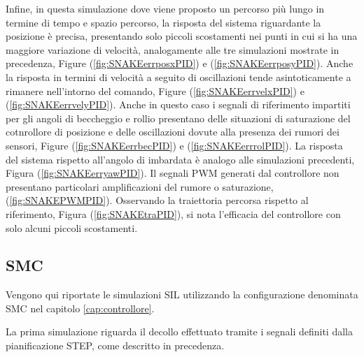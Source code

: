 Infine, in questa simulazione dove viene proposto un percorso più lungo in termine di tempo e spazio percorso, la risposta del sistema riguardante la posizione è precisa, presentando solo piccoli scostamenti nei punti in cui si ha una maggiore variazione di velocità, analogamente alle tre simulazioni mostrate in precedenza, Figure (\ref{fig:SNAKEerrposxPID}) e (\ref{fig:SNAKEerrposyPID}). Anche la risposta in termini di velocità a seguito di oscillazioni tende asintoticamente a rimanere nell'intorno del comando, Figure (\ref{fig:SNAKEerrvelxPID}) e (\ref{fig:SNAKEerrvelyPID}). Anche in questo caso i segnali di riferimento impartiti per gli angoli di beccheggio e rollio presentano delle situazioni di saturazione del cotnrollore di posizione e delle oscillazioni dovute alla presenza dei rumori dei sensori, Figure (\ref{fig:SNAKEerrbecPID}) e (\ref{fig:SNAKEerrrolPID}). La risposta del sistema rispetto all'angolo di imbardata è analogo alle simulazioni precedenti, Figura (\ref{fig:SNAKEerryawPID}). Il segnali PWM generati dal controllore non presentano particolari amplificazioni del rumore o saturazione, (\ref{fig:SNAKEPWMPID}). Osservando la traiettoria percorsa rispetto al riferimento, Figura (\ref{fig:SNAKEtraPID}), si nota l'efficacia del controllore con solo alcuni piccoli scostamenti.

\subsection{SMC}

Vengono qui riportate le simulazioni SIL utilizzando la configurazione denominata SMC nel capitolo \ref{cap:controllore}.

La prima simulazione riguarda il decollo effettuato tramite i segnali definiti dalla pianificazione STEP, come descritto in precedenza. 

